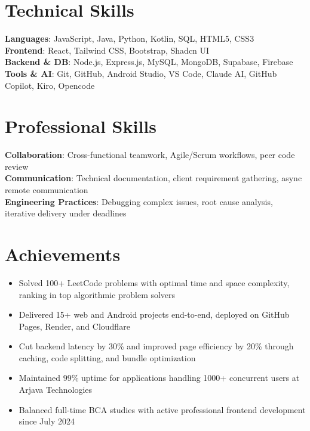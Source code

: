 \documentclass[letterpaper,10pt]{article}
\newcommand{\resumeItem}[1]{
  \item\small{{#1 \vspace{-2pt}}}
}
\newcommand{\resumeItemListStart}{\begin{itemize}[leftmargin=0.2in]\vspace{-2pt}}
\newcommand{\resumeItemListEnd}{\end{itemize}\vspace{-4pt}}
\begin{document}
\section{Technical Skills}
\begin{itemize}[leftmargin=0.15in, label={}]
    \small{\item{
    \textbf{Languages}{: JavaScript, Java, Python, Kotlin, SQL, HTML5, CSS3} \\
    \textbf{Frontend}{: React, Tailwind CSS, Bootstrap, Shadcn UI} \\
    \textbf{Backend \& DB}{: Node.js, Express.js, MySQL, MongoDB, Supabase, Firebase} \\
    \textbf{Tools \& AI}{: Git, GitHub, Android Studio, VS Code, Claude AI, GitHub Copilot, Kiro, Opencode} \\
    }}
\end{itemize}

\section{Professional Skills}
\begin{itemize}[leftmargin=0.15in, label={}]
    \small{\item{
    \textbf{Collaboration}{: Cross-functional teamwork, Agile/Scrum workflows, peer code review} \\
    \textbf{Communication}{: Technical documentation, client requirement gathering, async remote communication} \\
    \textbf{Engineering Practices}{: Debugging complex issues, root cause analysis, iterative delivery under deadlines}
    }}
\end{itemize}

\section{Achievements}
  \resumeItemListStart
   
    \resumeItem{Solved 100+ LeetCode problems with optimal time and space complexity, ranking in top algorithmic problem solvers}
    \resumeItem{Delivered 15+ web and Android projects end-to-end, deployed on GitHub Pages, Render, and Cloudflare}
    \resumeItem{Cut backend latency by 30\% and improved page efficiency by 20\% through caching, code splitting, and bundle optimization}
    \resumeItem{Maintained 99\% uptime for applications handling 1000+ concurrent users at Arjava Technologies}
    \resumeItem{Balanced full-time BCA studies with active professional frontend development since July 2024}
  \resumeItemListEnd
\end{document}
